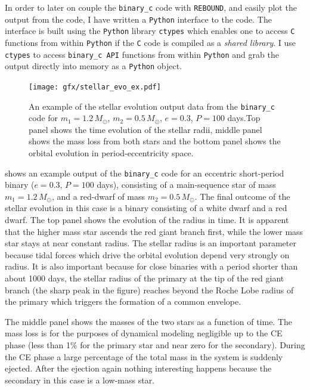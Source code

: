 \documentclass[twoside,openright,titlepage,numbers=noenddot,headinclude,%
                footinclude=true,cleardoublepage=empty,abstractoff, 
                BCOR=5mm,paper=a4,fontsize=11pt,%
                american,%
                ]{scrreprt}%
\begin{document}
In order to later on couple the \texttt{binary\_c} code with \texttt{REBOUND},
and easily plot the output from the code, I have written a \texttt{Python}
interface to the code. The interface is built using the \texttt{Python} 
library \texttt{ctypes} which enables one to access \texttt{C} functions
from within \texttt{Python} if the \texttt{C} code is compiled as a \emph{
    shared library}. I use \texttt{ctypes} to access \texttt{binary\_c API}
functions from within \texttt{Python} and grab the output directly into memory
as a \texttt{Python} object.
\begin{figure}[htb]
\centering
\texttt{[image: gfx/stellar\_evo\_ex.pdf]}
    \caption[Example stellar evolution trajectories.]{An example of the 
    stellar evolution output data from the \texttt{binary\_c}
    code for $m_1=1.2\,M_\odot$, $m_2=0.5\,M_\odot$, $e=0.3$, $P=100$ days.Top 
    panel shows the time evolution of the stellar radii, middle panel shows
    the mass loss from both stars and the bottom panel shows the 
    orbital evolution in period-eccentricity space.}
\label{fig:stellar_evo_ex}
\end{figure}

 shows an example output of the \texttt{binary\_c} code
for an eccentric short-period binary ($e=0.3$, $P=100$ days), consisting of a
main-sequence star of mass  
$m_1=1.2\,M_\odot$, and a red-dwarf of mass $m_2=0.5\,M_\odot$. 
The final outcome of the stellar evolution in this case is a binary 
consisting of a white dwarf and a red dwarf.
The top panel shows the evolution of the radius in time. It is apparent that 
the higher mass star ascends the red giant branch first, while the lower mass
star stays at near constant radius. The stellar radius is an important parameter
because tidal forces which drive the orbital evolution depend very strongly on 
radius. It is also important because for close binaries with a period shorter
than about 1000 days, the stellar radius of the primary at the tip of the 
red giant branch (the sharp peak in the figure) reaches beyond the Roche
Lobe radius of the primary which triggers the formation of a common envelope. 

The middle panel shows the masses of the two stars as a function of time.
The mass loss is for the purposes of dynamical modeling negligible up to 
the CE phase (less than 1\% for the primary star and near zero for the 
secondary). During the CE phase a large percentage of the total mass in 
the system is suddenly ejected. After the ejection again nothing interesting
happens because the secondary in this case is a low-mass star.
\end{document}
